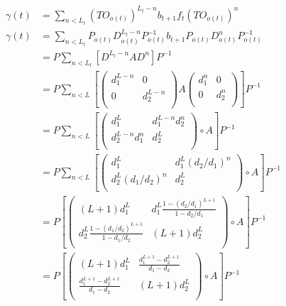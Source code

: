 \documentclass{article}
\begin{document}
  \begin{align*}
  \gamma(t) &= \sum_{n<L_t}(TO_{o(t)})^{L_t-n}b_{t+1}f_t(TO_{o(t)})^n\\
  \gamma(t) &= \sum_{n<L_t}P_{o(t)}D_{o(t)}^{L_t-n}P_{o(t)}^{-1}b_{t+1}P_{o(t)}D_{o(t)}^{n}P_{o(t)}^{-1}\\
  &= P\sum_{n<L_t}\left[D^{L_t-n}AD^{n}\right]P^{-1}\\
  &= P\sum_{n<L} \left[ \begin{pmatrix} d_1^{L-n} &0\\ 0 & d_2^{L-n}\\ \end{pmatrix} A \begin{pmatrix} d_1^n &0\\ 0 & d_2^n\\ \end{pmatrix}\right]P^{-1}\\
  &= P\sum_{n<L} \left[ \begin{pmatrix} d_1^L & d_1^{L-n}d_2^n\\ d_2^{L-n}d_1^n & d_2^L\\ \end{pmatrix} \circ A \right]P^{-1}\\
  &= P\sum_{n<L} \left[ \begin{pmatrix} d_1^L & d_1^L(d_2/d_1)^n\\ d_2^L(d_1/d_2)^n & d_2^L\\ \end{pmatrix} \circ A \right]P^{-1}\\
  &= P\left[ \begin{pmatrix} (L+1)d_1^L & d_1^L\frac{1-(d_2/d_1)^{L+1}}{1-d_2/d_1}\\ d_2^L\frac{1-(d_1/d_2)^{L+1}}{1-d_1/d_2} & (L+1) d_2^L\\ \end{pmatrix} \circ A \right]P^{-1}\\
  &= P\left[ \begin{pmatrix} (L+1)d_1^L & \frac{d_1^{L+1}-d_2^{L+1}}{d_1-d_2}\\ \frac{d_1^{L+1}
        -d_2^{L+1}}{d_1-d_2} & (L+1) d_2^L\\ \end{pmatrix} \circ A \right]P^{-1}\\
\end{align*}
\end{document}
